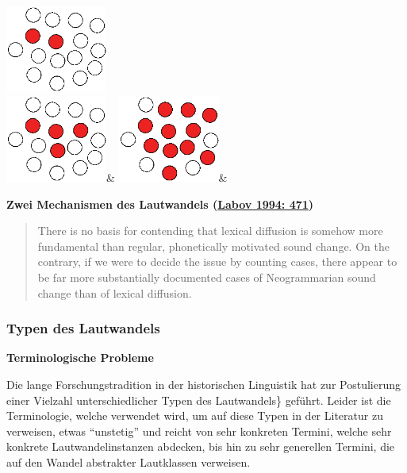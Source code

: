 \includegraphics[width=0.25\textwidth]{img/diffusion-2.png}\\
\includegraphics[width=0.25\textwidth]{img/diffusion-3.png}&
\includegraphics[width=0.25\textwidth]{img/diffusion-4.png}&
\\
\endtabular



\par\noindent\textbf{Zwei Mechanismen des Lautwandels
(\href{http://bibliography.lingpy.org?key=Labov1994}{Labov 1994: 471})}

\begin{quote}
There is no basis for contending that lexical diffusion is somehow more
fundamental than regular, phonetically motivated sound change. On the
contrary, if we were to decide the issue by counting cases, there appear
to be far more substantially documented cases of Neogrammarian sound
change than of lexical diffusion.
\end{quote}


\subsubsection{\texorpdfstring{{Typen des
Lautwandels}}{Typen des Lautwandels}}

\par\noindent\textbf{Terminologische Probleme}

Die lange Forschungstradition in der historischen Linguistik hat zur
Postulierung einer Vielzahl unterschiedlicher Typen des Lautwandels\}
geführt. Leider ist die Terminologie, welche verwendet wird, um auf
diese Typen in der Literatur zu verweisen, etwas ``unstetig'' und reicht
von sehr konkreten Termini, welche sehr konkrete Lautwandelinstanzen
abdecken, bis hin zu sehr generellen Termini, die auf den Wandel
abstrakter Lautklassen verweisen.



